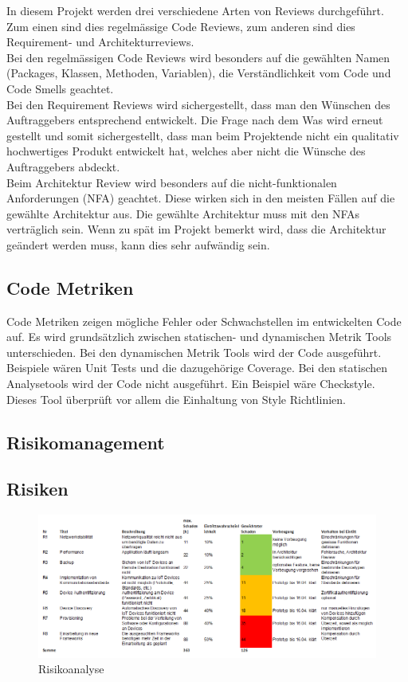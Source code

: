 \noindent In diesem Projekt werden drei verschiedene Arten von Reviews durchgeführt. Zum einen sind dies regelmässige Code Reviews, zum anderen sind dies Requirement- und Architekturreviews.\\

\noindent Bei den regelmässigen Code Reviews wird besonders auf die gewählten Namen (Packages, Klassen, Methoden, Variablen), die Verständlichkeit vom Code und Code Smells geachtet.\\

\noindent Bei den Requirement Reviews wird sichergestellt, dass man den Wünschen des Auftraggebers entsprechend entwickelt. Die Frage nach dem \glqq Was\grqq{} wird erneut gestellt und somit sichergestellt, dass man beim Projektende nicht ein qualitativ hochwertiges Produkt entwickelt hat, welches aber nicht die Wünsche des Auftraggebers abdeckt.\\ 

\noindent Beim Architektur Review wird besonders auf die nicht-funktionalen Anforderungen (NFA) geachtet. Diese wirken sich in den meisten Fällen auf die gewählte Architektur aus. Die gewählte Architektur muss mit den NFAs verträglich sein. Wenn zu spät im Projekt bemerkt wird, dass die Architektur geändert werden muss, kann dies sehr aufwändig sein.
\subsection{Code Metriken}
Code Metriken zeigen mögliche Fehler oder Schwachstellen im entwickelten Code auf. Es wird grundsätzlich zwischen statischen- und dynamischen Metrik Tools unterschieden. Bei den dynamischen Metrik Tools wird der Code ausgeführt. Beispiele wären Unit Tests und die dazugehörige Coverage. Bei den statischen Analysetools wird der Code nicht ausgeführt. Ein Beispiel wäre Checkstyle. Dieses Tool überprüft vor allem die Einhaltung von Style Richtlinien.

\begin{landscape}
\section{Risikomanagement}
\subsection{Risiken}
\begin{figure}[H]
\centering
\includegraphics[scale=0.9]{../01_Projektplanung/images/risikoanalyse.png}
\caption{Risikoanalyse}
\end{figure}
\end{landscape}
